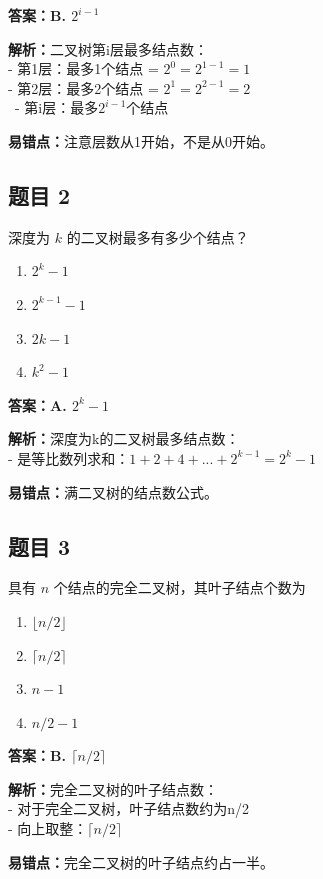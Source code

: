 \documentclass[12pt,a4paper]{ctexart}
\begin{document}
\begin{answerbox}
	\textbf{答案：B. $2^{i-1}$}

	\textbf{解析：}二叉树第i层最多结点数：\\
	- 第1层：最多1个结点 = $2^{0} = 2^{1-1} = 1$\\
	- 第2层：最多2个结点 = $2^{1} = 2^{2-1} = 2$\\\
	- 第i层：最多$2^{i-1}$个结点

	\textbf{易错点：}注意层数从1开始，不是从0开始。
\end{answerbox}

\subsection*{题目 2}
深度为 $k$ 的二叉树最多有多少个结点？
\begin{enumerate}[label=\Alph*.]
	\item $2^k-1$
	\item $2^{k-1}-1$
	\item $2k-1$
	\item $k^2-1$
\end{enumerate}

\begin{answerbox}
	\textbf{答案：A. $2^k-1$}

	\textbf{解析：}深度为k的二叉树最多结点数：\\
	- 是等比数列求和：$1 + 2 + 4 + ... + 2^{k-1} = 2^k - 1$

	\textbf{易错点：}满二叉树的结点数公式。
\end{answerbox}

\subsection*{题目 3}
具有 $n$ 个结点的完全二叉树，其叶子结点个数为
\begin{enumerate}[label=\Alph*.]
	\item $\lfloor n/2 \rfloor$
	\item $\lceil n/2 \rceil$
	\item $n-1$
	\item $n/2-1$
\end{enumerate}

\begin{answerbox}
	\textbf{答案：B. $\lceil n/2 \rceil$}

	\textbf{解析：}完全二叉树的叶子结点数：\\
	- 对于完全二叉树，叶子结点数约为n/2\\
	- 向上取整：$\lceil n/2 \rceil$

	\textbf{易错点：}完全二叉树的叶子结点约占一半。
\end{answerbox}
\end{document}
